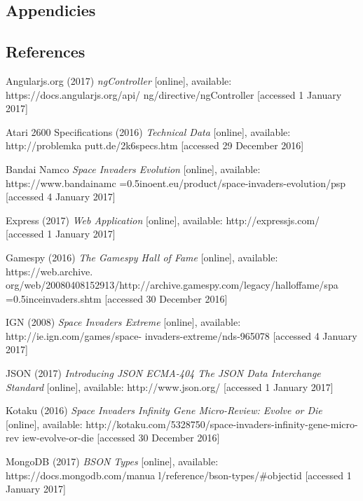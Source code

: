 \documentclass[12pt]{article}
\begin{document}
\begin{center}
\section{Appendicies}
\end{center}

\begin{center}
\section{References}
\end{center}
Angularjs.org (2017) \textit{ngController} [online], available: https://docs.angularjs.org/api/
\hangindent=0.5in ng/directive/ngController [accessed 1 January 2017]

Atari 2600 Specifications (2016) \textit{Technical Data} [online], available: http://problemka
\hangindent=0.5in putt.de/2k6specs.htm [accessed 29 December 2016]

Bandai Namco \textit{Space Invaders Evolution} [online], available:
https://www.bandainamc
\hangindent=0.5inoent.eu/product/space-invaders-evolution/psp [accessed
4 January 2017]

Express (2017) \textit{Web Application} [online], available: http://expressjs.com/ [accessed 
\hangindent=0.5in 1 January 2017]

Gamespy (2016) \textit{The Gamespy Hall of Fame} [online], available: https://web.archive.
\hangindent=0.5in org/web/20080408152913/http://archive.gamespy.com/legacy/halloffame/spa
\hangindent=0.5inceinvaders.shtm [accessed 30 December 2016]

IGN (2008) \textit{Space Invaders Extreme} [online], available: http://ie.ign.com/games/space-
\hangindent=0.5in invaders-extreme/nds-965078 [accessed 4 January 2017]

JSON (2017) \textit{Introducing JSON ECMA-404 The JSON Data Interchange Standard} [online], available: \hangindent=0.5in http://www.json.org/ [accessed 1 January 2017]

Kotaku (2016) \textit{Space Invaders Infinity Gene Micro-Review: Evolve or Die} [online], 
\hangindent=0.5in available: http://kotaku.com/5328750/space-invaders-infinity-gene-micro-rev
\hangindent=0.5in iew-evolve-or-die [accessed 30 December 2016]

MongoDB (2017) \textit{BSON Types} [online], available: https://docs.mongodb.com/manua
\hangindent=0.5in l/reference/bson-types/#objectid [accessed 1 January 2017]
\end{document}
